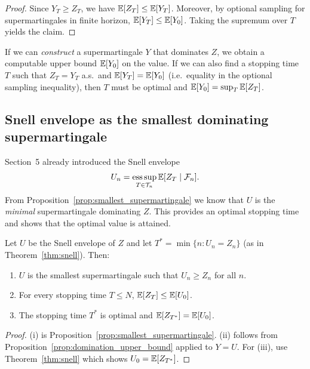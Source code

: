 \begin{proof}
Since $Y_T\ge Z_T$, we have $\mathbb{E}[Z_T]\le \mathbb{E}[Y_T]$. Moreover, by optional sampling for supermartingales
in finite horizon, $\mathbb{E}[Y_T]\le \mathbb{E}[Y_0]$. Taking the supremum over $T$ yields the claim.
\end{proof}

\begin{remark}
If we can \emph{construct} a supermartingale $Y$ that dominates $Z$, we obtain a computable upper bound
$\mathbb{E}[Y_0]$ on the value. If we can also find a stopping time $T$ such that $Z_T=Y_T$ a.s.\ and
$\mathbb{E}[Y_T]=\mathbb{E}[Y_0]$ (i.e.\ equality in the optional sampling inequality), then $T$ must be optimal and
$\mathbb{E}[Y_0]=\sup_T\mathbb{E}[Z_T]$.
\end{remark}

\subsection{Snell envelope as the \texorpdfstring{smallest}{smallest} dominating supermartingale}

Section~5 already introduced the Snell envelope
\[
U_n=\operatorname*{ess\,sup}_{T\in\mathcal{T}_n}\mathbb{E}[Z_T\mid \mathcal{F}_n].
\]
From Proposition~\ref{prop:smallest_supermartingale} we know that $U$ is the \emph{minimal} supermartingale
dominating $Z$.  This provides an optimal stopping time and shows that the optimal value is attained.

\begin{theorem}\label{thm:martingale_optimality_principle}
Let $U$ be the Snell envelope of $Z$ and let $T^\ast=\min\{n:U_n=Z_n\}$ (as in Theorem~\ref{thm:snell}).
Then:
\begin{enumerate}[label=(\roman*)]
\item $U$ is the smallest supermartingale such that $U_n\ge Z_n$ for all $n$.
\item For every stopping time $T\le N$, $\mathbb{E}[Z_T]\le \mathbb{E}[U_0]$.
\item The stopping time $T^\ast$ is optimal and $\mathbb{E}[Z_{T^\ast}]=\mathbb{E}[U_0]$.
\end{enumerate}
\end{theorem}

\begin{proof}
(i) is Proposition~\ref{prop:smallest_supermartingale}. (ii) follows from
Proposition~\ref{prop:domination_upper_bound} applied to $Y=U$.
For (iii), use Theorem~\ref{thm:snell} which shows $U_0=\mathbb{E}[Z_{T^\ast}]$.
\end{proof}


